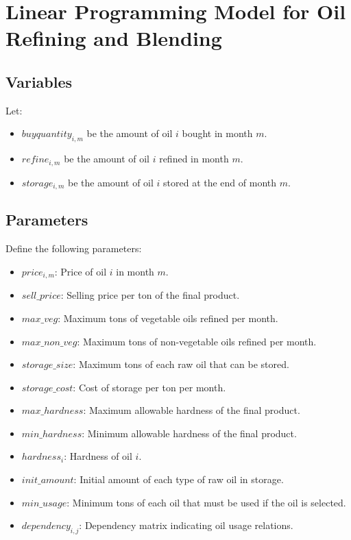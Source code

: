 \documentclass{article}
\begin{document}
\section*{Linear Programming Model for Oil Refining and Blending}

\subsection*{Variables}
Let:
\begin{itemize}
    \item \( buyquantity_{i,m} \) be the amount of oil \( i \) bought in month \( m \).
    \item \( refine_{i,m} \) be the amount of oil \( i \) refined in month \( m \).
    \item \( storage_{i,m} \) be the amount of oil \( i \) stored at the end of month \( m \).
\end{itemize}

\subsection*{Parameters}
Define the following parameters:
\begin{itemize}
    \item \( price_{i,m} \): Price of oil \( i \) in month \( m \).
    \item \( sell\_price \): Selling price per ton of the final product.
    \item \( max\_veg \): Maximum tons of vegetable oils refined per month.
    \item \( max\_non\_veg \): Maximum tons of non-vegetable oils refined per month.
    \item \( storage\_size \): Maximum tons of each raw oil that can be stored.
    \item \( storage\_cost \): Cost of storage per ton per month.
    \item \( max\_hardness \): Maximum allowable hardness of the final product.
    \item \( min\_hardness \): Minimum allowable hardness of the final product.
    \item \( hardness_{i} \): Hardness of oil \( i \).
    \item \( init\_amount \): Initial amount of each type of raw oil in storage.
    \item \( min\_usage \): Minimum tons of each oil that must be used if the oil is selected.
    \item \( dependency_{i,j} \): Dependency matrix indicating oil usage relations.
\end{itemize}
\end{document}
